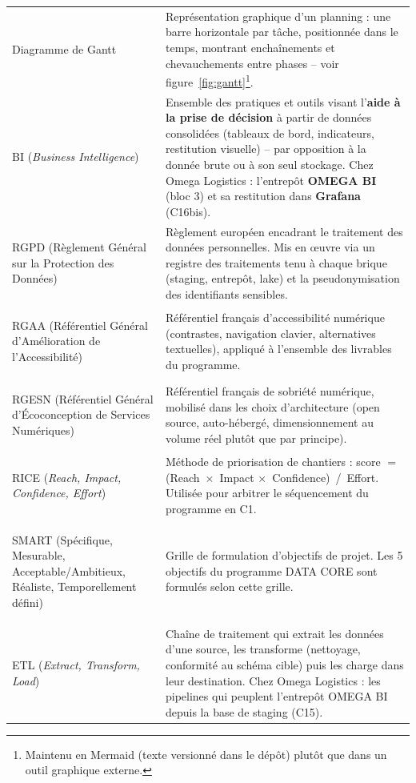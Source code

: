 \begin{longtable}{@{}>{\bfseries\raggedright}p{3.4cm} p{12.2cm}@{}}
\label{gloss:gantt}Diagramme de Gantt &
Représentation graphique d'un planning : une barre horizontale par
tâche, positionnée dans le temps, montrant enchaînements et
chevauchements entre phases -- voir
figure~\ref{fig:gantt}\footnote{Maintenu en Mermaid (texte versionné
dans le dépôt) plutôt que dans un outil graphique externe.}. \\

\label{gloss:bi}BI (\textit{Business Intelligence}) &
Ensemble des pratiques et outils visant l'\textbf{aide à la prise de
décision} à partir de données consolidées (tableaux de bord,
indicateurs, restitution visuelle) -- par opposition à la donnée brute
ou à son seul stockage. Chez Omega Logistics : l'entrepôt
\textbf{OMEGA BI} (bloc 3) et sa restitution dans \textbf{Grafana}
(C16bis). \\

\label{gloss:rgpd}RGPD (Règlement Général sur la Protection des
Données) &
Règlement européen encadrant le traitement des données personnelles.
Mis en œuvre via un registre des traitements tenu à chaque brique
(staging, entrepôt, lake) et la pseudonymisation des identifiants
sensibles. \\

\label{gloss:rgaa}RGAA (Référentiel Général d'Amélioration de
l'Accessibilité) &
Référentiel français d'accessibilité numérique (contrastes, navigation
clavier, alternatives textuelles), appliqué à l'ensemble des livrables
du programme. \\

\label{gloss:rgesn}RGESN (Référentiel Général d'Écoconception de
Services Numériques) &
Référentiel français de sobriété numérique, mobilisé dans les choix
d'architecture (open source, auto-hébergé, dimensionnement au volume
réel plutôt que par principe). \\

\label{gloss:rice}RICE (\textit{Reach, Impact, Confidence, Effort}) &
Méthode de priorisation de chantiers : score $=$ (Reach~$\times$~Impact
$\times$~Confidence)~/~Effort. Utilisée pour arbitrer le séquencement
du programme en C1. \\

\label{gloss:smart}SMART (Spécifique, Mesurable,
Acceptable/Ambitieux, Réaliste, Temporellement défini) &
Grille de formulation d'objectifs de projet. Les 5 objectifs du
programme DATA CORE sont formulés selon cette grille. \\

\label{gloss:etl}ETL (\textit{Extract, Transform, Load}) &
Chaîne de traitement qui extrait les données d'une source, les
transforme (nettoyage, conformité au schéma cible) puis les charge
dans leur destination. Chez Omega Logistics : les pipelines qui
peuplent l'entrepôt OMEGA BI depuis la base de staging (C15). \\


\end{longtable}
